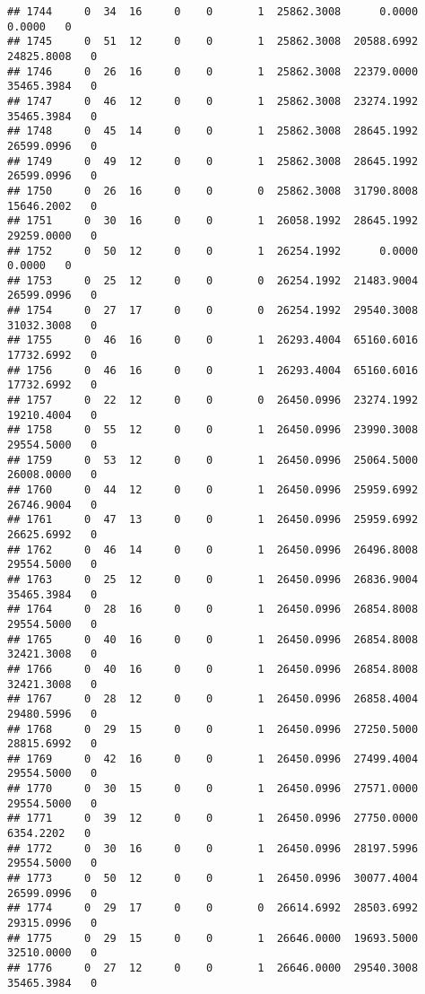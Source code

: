 \documentclass[
]{article}
\begin{document}
\begin{enumerate}
\begin{verbatim}
## 1744     0  34  16     0    0       1  25862.3008      0.0000      0.0000   0
## 1745     0  51  12     0    0       1  25862.3008  20588.6992  24825.8008   0
## 1746     0  26  16     0    0       1  25862.3008  22379.0000  35465.3984   0
## 1747     0  46  12     0    0       1  25862.3008  23274.1992  35465.3984   0
## 1748     0  45  14     0    0       1  25862.3008  28645.1992  26599.0996   0
## 1749     0  49  12     0    0       1  25862.3008  28645.1992  26599.0996   0
## 1750     0  26  16     0    0       0  25862.3008  31790.8008  15646.2002   0
## 1751     0  30  16     0    0       1  26058.1992  28645.1992  29259.0000   0
## 1752     0  50  12     0    0       1  26254.1992      0.0000      0.0000   0
## 1753     0  25  12     0    0       0  26254.1992  21483.9004  26599.0996   0
## 1754     0  27  17     0    0       0  26254.1992  29540.3008  31032.3008   0
## 1755     0  46  16     0    0       1  26293.4004  65160.6016  17732.6992   0
## 1756     0  46  16     0    0       1  26293.4004  65160.6016  17732.6992   0
## 1757     0  22  12     0    0       0  26450.0996  23274.1992  19210.4004   0
## 1758     0  55  12     0    0       1  26450.0996  23990.3008  29554.5000   0
## 1759     0  53  12     0    0       1  26450.0996  25064.5000  26008.0000   0
## 1760     0  44  12     0    0       1  26450.0996  25959.6992  26746.9004   0
## 1761     0  47  13     0    0       1  26450.0996  25959.6992  26625.6992   0
## 1762     0  46  14     0    0       1  26450.0996  26496.8008  29554.5000   0
## 1763     0  25  12     0    0       1  26450.0996  26836.9004  35465.3984   0
## 1764     0  28  16     0    0       1  26450.0996  26854.8008  29554.5000   0
## 1765     0  40  16     0    0       1  26450.0996  26854.8008  32421.3008   0
## 1766     0  40  16     0    0       1  26450.0996  26854.8008  32421.3008   0
## 1767     0  28  12     0    0       1  26450.0996  26858.4004  29480.5996   0
## 1768     0  29  15     0    0       1  26450.0996  27250.5000  28815.6992   0
## 1769     0  42  16     0    0       1  26450.0996  27499.4004  29554.5000   0
## 1770     0  30  15     0    0       1  26450.0996  27571.0000  29554.5000   0
## 1771     0  39  12     0    0       1  26450.0996  27750.0000   6354.2202   0
## 1772     0  30  16     0    0       1  26450.0996  28197.5996  29554.5000   0
## 1773     0  50  12     0    0       1  26450.0996  30077.4004  26599.0996   0
## 1774     0  29  17     0    0       0  26614.6992  28503.6992  29315.0996   0
## 1775     0  29  15     0    0       1  26646.0000  19693.5000  32510.0000   0
## 1776     0  27  12     0    0       1  26646.0000  29540.3008  35465.3984   0

\end{verbatim}
\end{enumerate}
\end{document}
